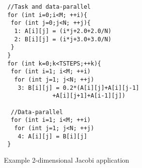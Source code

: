 \begin{scriptsize}
  \begin{figure}[h!]
    \centering
\begin{verbatim}
 //Task and data-parallel
 for (int i=0;i<M; ++i){
  for (int j=0;j<N; ++j){
   1: A[i][j] = (i*j+2.0+2.0/N)
   2: B[i][j] = (i*j+3.0+3.0/N)
  }
 }
 for (int k=0;k<TSTEPS;++k){
  for (int i=1; i<M; ++i)
   for (int j=1; j<N; ++j)
    3: B[i][j] = 0.2*(A[i][j]+A[i][j-1]
              +A[i][j+1]+A[i-1][j])

  //Data-parallel
  for (int i=1; i<M; ++i)
   for (int j=1; j<N; ++j)
    4: A[i][j] = B[i][j]
 }
\end{verbatim}
    \caption{Example 2-dimensional Jacobi application}
    \label{fig:2}
  \end{figure}
\end{scriptsize}




